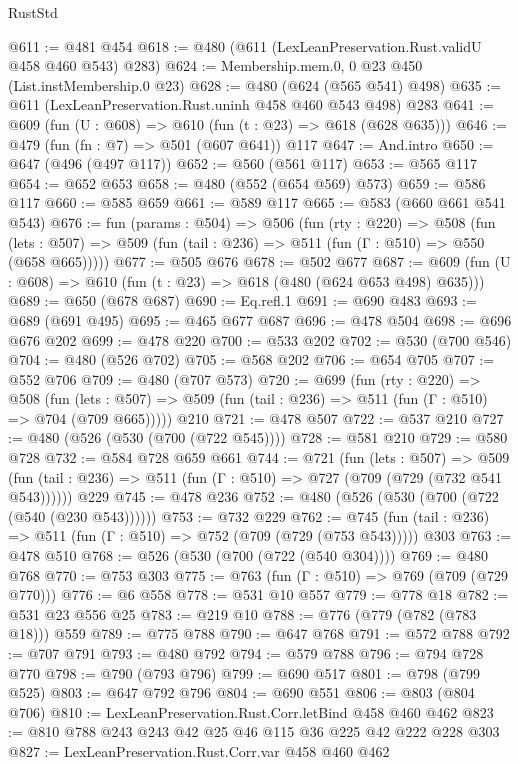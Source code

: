 \begin{lexlean}{RustStd}
\begin{coremodule}
@611 := @481 @454
@618 := @480 (@611 (LexLeanPreservation.Rust.validU @458 @460 @543) @283)
@624 := Membership.mem.{0, 0} @23 @450 (List.instMembership.{0} @23)
@628 := @480 (@624 (@565 @541) @498)
@635 := @611 (LexLeanPreservation.Rust.uninh @458 @460 @543 @498) @283
@641 := @609 (fun (U : @608) => @610 (fun (t : @23) => @618 (@628 @635)))
@646 := @479 (fun (fn : @7) => @501 (@607 @641)) @117
@647 := And.intro
@650 := @647 (@496 (@497 @117))
@652 := @560 (@561 @117)
@653 := @565 @117
@654 := @652 @653
@658 := @480 (@552 (@654 @569) @573)
@659 := @586 @117
@660 := @585 @659
@661 := @589 @117
@665 := @583 (@660 @661 @541 @543)
@676 := fun (params : @504) =>
  @506
    (fun (rty : @220) =>
    @508
      (fun (lets : @507) => @509 (fun (tail : @236) => @511 (fun (Γ : @510) => @550 (@658 @665)))))
@677 := @505 @676
@678 := @502 @677
@687 := @609 (fun (U : @608) => @610 (fun (t : @23) => @618 (@480 (@624 @653 @498) @635)))
@689 := @650 (@678 @687)
@690 := Eq.refl.{1}
@691 := @690 @483
@693 := @689 (@691 @495)
@695 := @465 @677 @687
@696 := @478 @504
@698 := @696 @676 @202
@699 := @478 @220
@700 := @533 @202
@702 := @530 (@700 @546)
@704 := @480 (@526 @702)
@705 := @568 @202
@706 := @654 @705
@707 := @552 @706
@709 := @480 (@707 @573)
@720 := @699
    (fun (rty : @220) =>
    @508
      (fun (lets : @507) => @509 (fun (tail : @236) => @511 (fun (Γ : @510) => @704 (@709 @665)))))
    @210
@721 := @478 @507
@722 := @537 @210
@727 := @480 (@526 (@530 (@700 (@722 @545))))
@728 := @581 @210
@729 := @580 @728
@732 := @584 @728 @659 @661
@744 := @721
    (fun (lets : @507) =>
    @509 (fun (tail : @236) => @511 (fun (Γ : @510) => @727 (@709 (@729 (@732 @541 @543))))))
    @229
@745 := @478 @236
@752 := @480 (@526 (@530 (@700 (@722 (@540 (@230 @543))))))
@753 := @732 @229
@762 := @745 (fun (tail : @236) => @511 (fun (Γ : @510) => @752 (@709 (@729 (@753 @543))))) @303
@763 := @478 @510
@768 := @526 (@530 (@700 (@722 (@540 @304))))
@769 := @480 @768
@770 := @753 @303
@775 := @763 (fun (Γ : @510) => @769 (@709 (@729 @770)))
@776 := @6 @558
@778 := @531 @10 @557
@779 := @778 @18
@782 := @531 @23 @556 @25
@783 := @219 @10
@788 := @776 (@779 (@782 (@783 @18))) @559
@789 := @775 @788
@790 := @647 @768
@791 := @572 @788
@792 := @707 @791
@793 := @480 @792
@794 := @579 @788
@796 := @794 @728 @770
@798 := @790 (@793 @796)
@799 := @690 @517
@801 := @798 (@799 @525)
@803 := @647 @792 @796
@804 := @690 @551
@806 := @803 (@804 @706)
@810 := LexLeanPreservation.Rust.Corr.letBind @458 @460 @462
@823 := @810 @788 @243 @243 @42 @25 @46 @115 @36 @225 @42 @222 @228 @303
@827 := LexLeanPreservation.Rust.Corr.var @458 @460 @462

\end{coremodule}
\end{lexlean}
